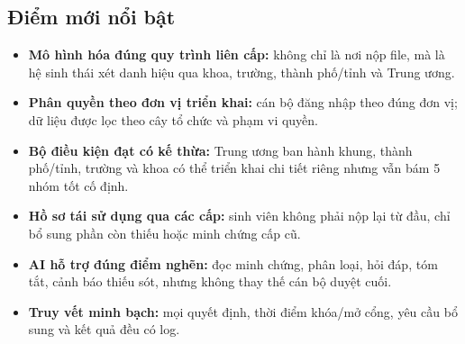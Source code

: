 \subsection{Điểm mới nổi bật}

\begin{itemize}
    \item \textbf{Mô hình hóa đúng quy trình liên cấp:} không chỉ là nơi nộp file, mà là hệ sinh thái xét danh hiệu qua khoa, trường, thành phố/tỉnh và Trung ương.
    \item \textbf{Phân quyền theo đơn vị triển khai:} cán bộ đăng nhập theo đúng đơn vị; dữ liệu được lọc theo cây tổ chức và phạm vi quyền.
    \item \textbf{Bộ điều kiện đạt có kế thừa:} Trung ương ban hành khung, thành phố/tỉnh, trường và khoa có thể triển khai chi tiết riêng nhưng vẫn bám 5 nhóm tốt cố định.
    \item \textbf{Hồ sơ tái sử dụng qua các cấp:} sinh viên không phải nộp lại từ đầu, chỉ bổ sung phần còn thiếu hoặc minh chứng cấp cũ.
    \item \textbf{AI hỗ trợ đúng điểm nghẽn:} đọc minh chứng, phân loại, hỏi đáp, tóm tắt, cảnh báo thiếu sót, nhưng không thay thế cán bộ duyệt cuối.
    \item \textbf{Truy vết minh bạch:} mọi quyết định, thời điểm khóa/mở cổng, yêu cầu bổ sung và kết quả đều có log.
\end{itemize}